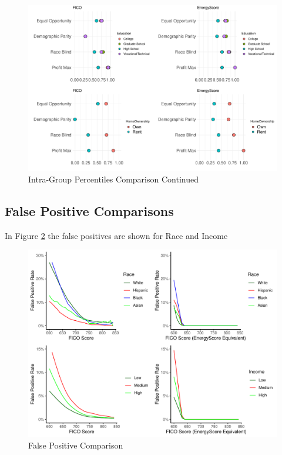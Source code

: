 \documentclass[11pt,]{article}
\begin{document}
\begin{figure}
\centering
\includegraphics{figs/intra2.pdf}
\caption{\label{fig:intra2}Intra-Group Percentiles Comparison Continued}
\end{figure}

\hypertarget{false-positive-comparisons}{%
\subsection{False Positive
Comparisons}\label{false-positive-comparisons}}

In Figure \ref{fig:fprace} the false positives are shown for Race and
Income

\begin{figure}
\centering
\includegraphics{figs/fprace.pdf}
\caption{\label{fig:fprace}False Positive Comparison}
\end{figure}
\end{document}
